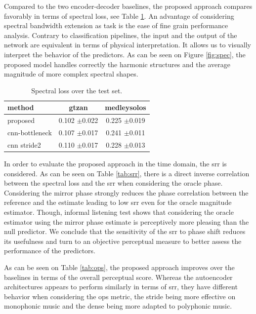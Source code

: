 \documentclass{article}
\begin{document}
Compared to the two encoder-decoder baselines, the proposed approach compares favorably in terms of spectral loss, see Table \ref{tab:loss}. An advantage of considering spectral bandwidth extension as task is the ease of fine grain performance analysis. Contrary to classification pipelines, the input and the output of the network are equivalent in terms of physical interpretation. It allows us to visually interpret the behavior of the predictors. As can be seen on Figure \ref{fig:spec}, the proposed model handles correctly the harmonic structures and the average magnitude of more complex spectral shapes.

\begin{table}[t]
  \begin{center}
\begin{tabular}{lcc}
method & gtzan & medleysolos \\
\hline
proposed & 0.102 $\pm$0.022 & 0.225 $\pm$0.019 \\
cnn-bottleneck & 0.107 $\pm$0.017 & 0.241 $\pm$0.011 \\
cnn stride2 & 0.110 $\pm$0.017 & 0.228 $\pm$0.013 \\
\end{tabular}
\caption{Spectral loss over the test set.}
\label{tab:loss}
\end{center}
\vspace{-4mm}
\end{table}

In order to evaluate the proposed approach in the time domain, the srr is considered. As can be seen on Table \ref{tab:srr}, there is a direct inverse correlation between the spectral loss and the srr when considering the oracle phase. Considering the mirror phase strongly reduces the phase correlation between the reference and the estimate leading to low srr even for the oracle magnitude estimator. Though, informal listening test shows that considering the oracle estimator using the mirror phase estimate is perceptively more pleasing than the null predictor. We conclude that the sensitivity of the srr to phase shift reduces its usefulness and turn to an objective perceptual measure to better assess the performance of the predictors.

As can be seen on Table \ref{tab:ops}, the proposed approach improves over the baselines in terms of the overall perceptual score. Whereas the autoencoder architectures appears to perform similarly in terms of srr, they have different behavior when considering the ops metric, the stride being more effective on monophonic music and the dense being more adapted to polyphonic music.
\end{document}
